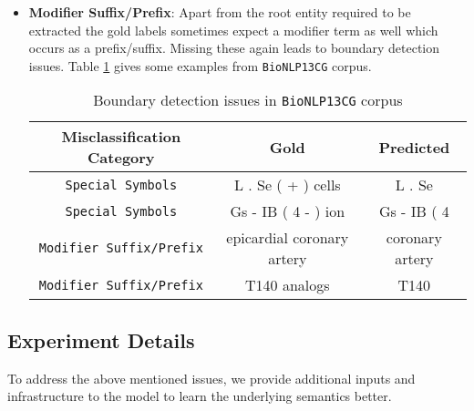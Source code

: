 \begin{itemize}
    \item \textbf{Modifier Suffix/Prefix}: Apart from the root entity required to be extracted the gold labels sometimes expect a modifier term as well which occurs as a prefix/suffix. Missing these again leads to boundary detection issues. Table \ref{tab:boundary_issue} gives some examples from \texttt{BioNLP13CG} corpus.
    
    \begin{table}[h!]
    \centering
    \begin{tabular}{|c|c|c|}\hline
    	\textbf{Misclassification Category} & \textbf{Gold} & \textbf{Predicted}\\\hline
    	\texttt{Special Symbols} & L . Se ( + ) cells & L . Se\\\hline
    	\texttt{Special Symbols} & Gs - IB ( 4 - ) ion & Gs - IB ( 4\\\hline
    	\texttt{Modifier Suffix/Prefix} & epicardial coronary artery & coronary artery\\\hline
    	\texttt{Modifier Suffix/Prefix} & T140 analogs & T140\\\hline
    	\end{tabular}
        \caption{Boundary detection issues in \texttt{BioNLP13CG} corpus}
        \label{tab:boundary_issue}
    \end{table}
\end{itemize}

\subsection{Experiment Details}

To address the above mentioned issues, we provide additional inputs and infrastructure to the model to learn the underlying semantics better.

